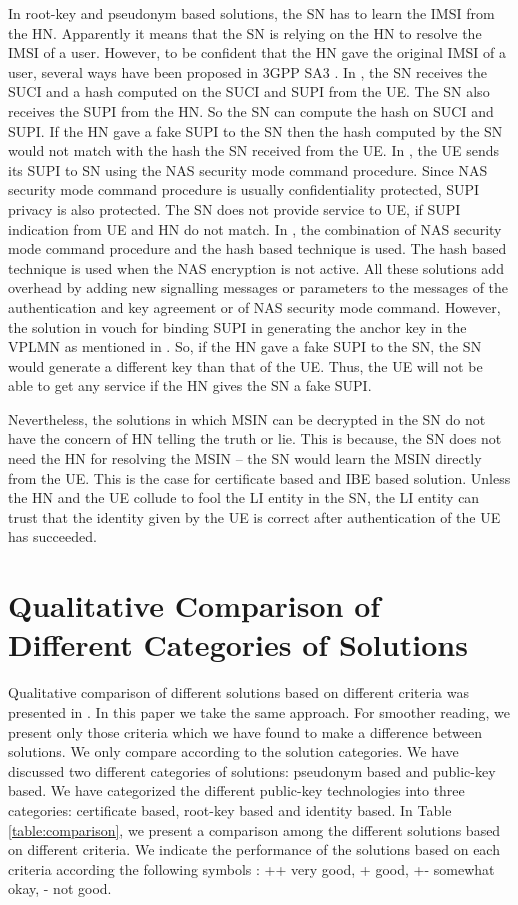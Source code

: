 \documentclass[conference]{IEEEtran}
\begin{document}
In root-key and pseudonym based solutions, the SN has to learn the IMSI from the HN. Apparently it means that the SN is relying on the HN to resolve the IMSI of a user. However, to be confident that the HN gave the original IMSI of a user, several ways have been proposed in 3GPP SA3 \cite{NokiaLI,NokiaLI1,EricssonLI,CATTLI,KPNDOCOMOLI}. In \cite{NokiaLI, NokiaLI1}, the SN receives the SUCI and a hash computed on the SUCI and SUPI from the UE. The SN also receives the SUPI from the HN. So the SN can compute the hash on SUCI and SUPI. If the HN gave a fake SUPI to the SN then the hash computed by the SN would not match with the hash the SN received from the UE. In \cite{EricssonLI}, the UE sends its SUPI to SN using the NAS security mode command procedure. Since NAS security mode command procedure is usually confidentiality protected, SUPI privacy is also protected. The SN does not provide service to UE, if SUPI indication from UE and HN do not match. In \cite{CATTLI}, the combination of NAS security mode command procedure and the hash based technique is used. The hash based technique is used when the NAS encryption is not active. All these solutions add overhead by adding new signalling messages or parameters to the messages of the authentication and key agreement or of NAS security mode command. However, the solution in \cite{KPNDOCOMOLI} vouch for binding SUPI in generating the anchor key in the VPLMN as mentioned in \cite{SUPIBinding}. So, if the HN gave a fake SUPI to the SN, the SN would generate a different key than that of the UE. Thus, the UE will not be able to get any service if the HN gives the SN a fake SUPI.


Nevertheless, the solutions in which MSIN can be decrypted in the SN do not have the concern of HN telling the truth or lie. This is because, the SN does not need the HN for resolving the MSIN -- the SN would learn the MSIN directly from the UE. This is the case for certificate based and IBE based solution. Unless the HN and the UE collude to fool the LI entity in the SN, the LI entity can trust that the identity given by the UE is correct after authentication of the UE has succeeded.


\section{Qualitative Comparison of Different Categories of Solutions} \label{section:comparison}
Qualitative comparison of different solutions based on different criteria was presented in \cite{ICTJournal,IBE_mohsin}. In this paper we take the same approach. For smoother reading, we present only those criteria which we have found to make a difference between solutions. We only compare according to the solution categories.  We have discussed two different categories of solutions: pseudonym based and public-key based. We have categorized the different public-key technologies into three categories: certificate based, root-key based and identity based. In Table \ref{table:comparison}, we present a comparison among the different solutions based on different criteria. We indicate the performance of the solutions based on each criteria according the following symbols : ++ very good, + good, +- somewhat okay, - not good.
\end{document}
